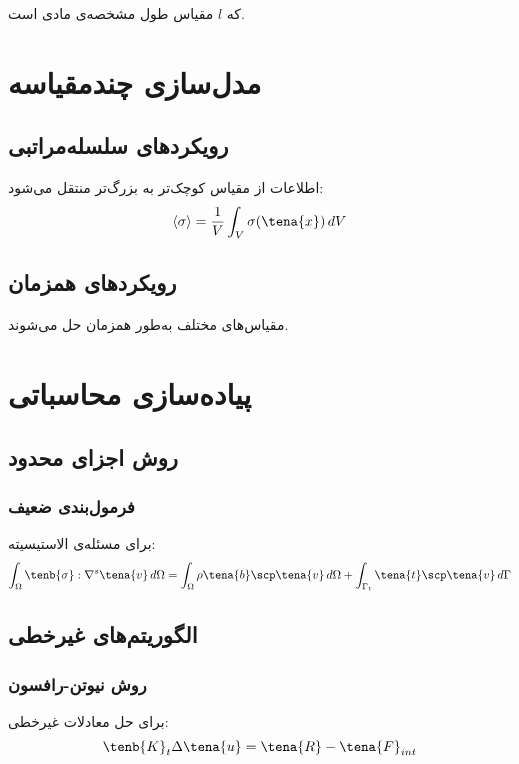 که $l$ مقیاس طول مشخصه‌ی مادی است.

\section{مدل‌سازی چندمقیاسه}

\subsection{رویکردهای سلسله‌مراتبی}

اطلاعات از مقیاس کوچک‌تر به بزرگ‌تر منتقل می‌شود:
\begin{equation}
	\langle \sigma \rangle = \frac{1}{V} \int_V \sigma(\tena{x}) \, dV
\end{equation}

\subsection{رویکردهای همزمان}

مقیاس‌های مختلف به‌طور همزمان حل می‌شوند.

\section{پیاده‌سازی محاسباتی}

\subsection{روش اجزای محدود}

\subsubsection{فرمول‌بندی ضعیف}
برای مسئله‌ی الاستیسیته:
\begin{equation}
	\int_\Omega \tenb{\sigma} : \nabla^s \tena{v} \, d\Omega = \int_\Omega \rho \tena{b} \scp \tena{v} \, d\Omega + \int_{\Gamma_t} \tena{t} \scp \tena{v} \, d\Gamma
\end{equation}

\subsection{الگوریتم‌های غیرخطی}

\subsubsection{روش نیوتن-رافسون}
برای حل معادلات غیرخطی:
\begin{equation}
	\tenb{K}_t \Delta \tena{u} = \tena{R} - \tena{F}_{int}
\end{equation}

